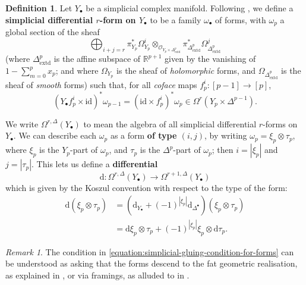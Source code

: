 \documentclass[11pt,fleqn]{article}
\theoremstyle{plain}
\theoremstyle{definition}
\newtheorem{definition}[theorem]{Definition}
\theoremstyle{remark}
\newtheorem{remark}[theorem]{Remark}
\numberwithin{equation}{theorem}
\newcommand{\OO}{\mathcal{O}}
\newcommand{\id}{\mathrm{id}}
\newcommand{\define}[1]{\textbf{#1}}
\renewcommand{\d}{\mathrm{d}}
\begin{document}
        \begin{definition}
            Let $Y_\bullet$ be a simplicial complex manifold.
            Following \cite{Dupont1976}, we define a \define{simplicial differential $r$-form on $Y_{\bullet}$} to be a family $\omega_\bullet$ of forms, with $\omega_p$ a global section of the sheaf
            \[
                \bigoplus_{i+j=r}
                    \pi_{Y_p}^* \Omega_{Y_p}^i
                    \otimes_{\OO_{Y_p\times \Delta^p_\mathrm{extd}}}
                    \pi_{\Delta^p_\mathrm{extd}}^* \Omega_{\Delta^p_\mathrm{extd}}^j
            \]
            (where $\Delta^p_\mathrm{extd}$ is the affine subspace of $\mathbb{R}^{p+1}$ given by the vanishing of $1-\sum_{m=0}^p x_p$; and where $\Omega_{Y_p}$ is the sheaf of \emph{holomorphic} forms, and $\Omega_{\Delta^p_\mathrm{extd}}$ is the sheaf of \emph{smooth} forms) such that, for all \emph{coface} maps $f_p^i\colon[p-1]\to[p]$,
            \begin{equation}
            \label{equation:simplicial-gluing-condition-for-forms}
                \left(Y_\bullet f_p^i\times\id\right)^*\omega_{p-1}
                = \left(\id\times f_p^i\right)^*\omega_p
                \in \Omega^r(Y_{p}\times\Delta^{p-1}).
            \end{equation}

            We write $\Omega^{r,\Delta}(Y_\bullet)$ to mean the algebra of all simplicial differential $r$-forms on $Y_\bullet$.
            We can describe each $\omega_p$ as a form \define{of type $(i,j)$}, by writing $\omega_p = \xi_p\otimes\tau_p$, where $\xi_p$ is the $Y_p$-part of $\omega_p$, and $\tau_p$ is the $\Delta^p$-part of $\omega_p$; then $i=|\xi_p|$ and $j=|\tau_p|$.
            This lets us define a \define{differential}
            \[
                \d \colon \Omega^{r,\Delta}(Y_\bullet) \longrightarrow \Omega^{r+1,\Delta}(Y_\bullet)
            \]
            which is given by the Koszul convention with respect to the type of the form:
            \begin{align*}
                \d(\xi_p\otimes\tau_p)
                &= \left(\d_{Y_\bullet} + (-1)^{|\xi_p|}\d_{\Delta^\bullet}\right) (\xi_p\otimes\tau_p)
            \\  &= \d\xi_p\otimes\tau_p + (-1)^{|\xi_p|}\xi_p\otimes\d\tau_p.
            \end{align*}
        \end{definition}

        \begin{remark}
            The condition in \cref{equation:simplicial-gluing-condition-for-forms} can be understood as asking that the forms descend to the fat geometric realisation, as explained in \cite{Dupont1976}, or via framings, as alluded to in \cite{Hosgood2020}.
        \end{remark}
\end{document}
